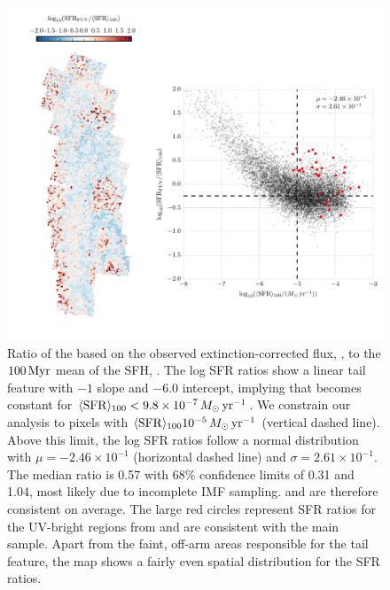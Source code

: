 \begin{figure}
\centering
\includegraphics[width=\textwidth]{m31flux-figures/sfr_fuv-vs-mean.pdf}
\caption[Ratio of the \sfr{} based on the observed extinction-corrected \fuv{}
flux to the $100\myr$ mean \sfr{}.]{Ratio of the \sfr{} based on the observed
    extinction-corrected \fuv{} flux, \sfrfuv{}, to the $100\myr$ mean of the
    SFH, \sfroneh{}. The log SFR ratios show a linear tail feature with $-1$
    slope and $-6.0$ intercept, implying that \sfrfuv{} becomes constant for
    $\langle\mathrm{SFR}\rangle_{100} < 9.8\times 10^{-7}\,M_\odot\,\mathrm{yr}^{-1}$. We constrain our analysis to
    pixels with $\langle\mathrm{SFR}\rangle_{100}10^{-5}\,M_\odot\,\mathrm{yr}^{-1}$ (vertical dashed line). Above
    this limit, the log SFR ratios follow a normal distribution with $\mu =
    -2.46\times 10^{-1}$ (horizontal dashed line) and $\sigma = 2.61\times
    10^{-1}$. The median ratio is 0.57 with 68\% confidence limits of 0.31 and
    1.04, most likely due to incomplete IMF sampling. \sfrfuv{} and \sfroneh{}
    are therefore consistent on average. The large red circles represent SFR
    ratios for the UV-bright regions from \citet{Simones:2014} and are
    consistent with the main sample. Apart from the faint, off-arm areas
    responsible for the tail feature, the map shows a fairly even spatial
    distribution for the SFR ratios.
}
\label{fig:mfx:fuvsfrratio}
\end{figure}


